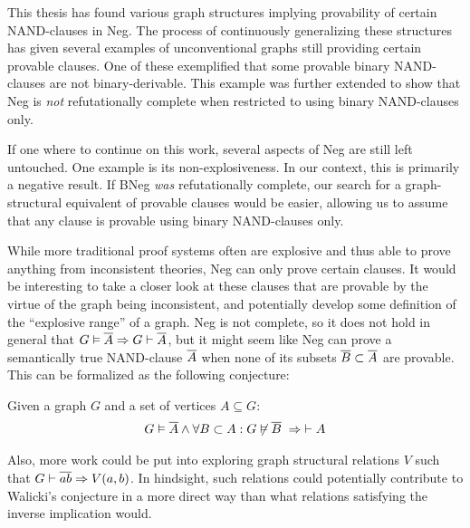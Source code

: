 This thesis has found various graph structures implying provability of certain NAND-clauses in Neg.
The process of continuously generalizing these structures has given several examples of unconventional graphs still providing certain provable clauses.
One of these exemplified that some provable binary NAND-clauses are not binary-derivable.
This example was further extended to show that Neg is \textit{not} refutationally complete when restricted to using binary NAND-clauses only.

If one where to continue on this work, several aspects of Neg are still left untouched.
One example is its non-explosiveness.
In our context, this is primarily a negative result.
If BNeg \textit{was} refutationally complete, our search for a graph-structural equivalent of provable clauses would be easier, allowing us to assume that any clause is provable using binary NAND-clauses only.

While more traditional proof systems often are explosive and thus able to prove anything from inconsistent theories, Neg can only prove certain clauses.
It would be interesting to take a closer look at these clauses that are provable by the virtue of the graph being inconsistent, and potentially develop some definition of the ``explosive range'' of a graph.
Neg is not complete, so it does not hold in general that $G \vDash \ol{A} \Rightarrow G \vdash \ol{A}$, but it might seem like Neg can prove a semantically true NAND-clause $\ol{A}$ when none of its subsets $\ol{B} \subset \ol{A}$ are provable.
This can be formalized as the following conjecture:
\begin{conjecture}
  Given a graph $G$ and a set of vertices $A \subseteq G$:
  \begin{align}
    G \vDash \ol{A} \wedge \forall B \subset A: G \not\vDash \ol{ B } \;\Rightarrow \; \vdash A
  \end{align}
\end{conjecture}

Also, more work could be put into exploring graph structural relations $V$ such that $G \vdash \ol{ab} \Rightarrow V(a,b)$.
In hindsight, such relations could potentially contribute to Walicki's conjecture in a more direct way than what relations satisfying the inverse implication would.
